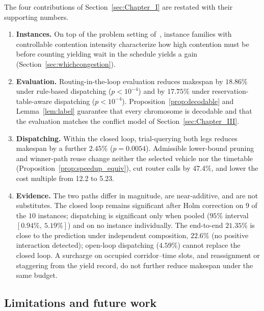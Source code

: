 \documentclass[manuscript,screen,review]{acmart}
\newcommand{\NCases}{10}
\newcommand{\GainLoopRule}{18.86\%}      %
\newcommand{\PLoopRule}{<10^{-4}}
\newcommand{\GainLoopProbe}{17.75\%}     %
\newcommand{\PLoopProbe}{<10^{-4}}
\newcommand{\GainProbeOpen}{4.59\%}      %
\newcommand{\GainProbeLoop}{2.45\%}      %
\newcommand{\PProbeLoop}{=0.0054}
\newcommand{\GainEndToEnd}{21.35\%}      %
\newcommand{\CIProbeLoop}{$[0.94\%,\ 5.19\%]$}
\newcommand{\GainIndepProduct}{22.6\%}
\newcommand{\CellsSigLoopAdj}{9}
\newcommand{\RouteCallCut}{47.4\%}
\newcommand{\CostMultBefore}{12.2}
\newcommand{\CostMultAfter}{5.23}
\begin{document}
The four contributions of Section~\ref{sec:Chapter_I} are restated with their supporting numbers.
\begin{enumerate}[leftmargin=*,topsep=2pt,itemsep=2pt]
\item \textbf{Instances.} On top of the problem setting of~\cite{vanos2026exact}, instance families with controllable contention intensity characterize how high contention must be before counting yielding wait in the schedule yields a gain (Section~\ref{sec:whichcongestion}).
\item \textbf{Evaluation.} Routing-in-the-loop evaluation reduces makespan by $\GainLoopRule$ under rule-based dispatching ($p\PLoopRule$) and by $\GainLoopProbe$ under reservation-table-aware dispatching ($p\PLoopProbe$).
Proposition~\ref{prop:decodable} and Lemma~\ref{lem:label} guarantee that every chromosome is decodable and that the evaluation matches the conflict model of Section~\ref{sec:Chapter_III}.
\item \textbf{Dispatching.} Within the closed loop, trial-querying both legs reduces makespan by a further $\GainProbeLoop$ ($p\PProbeLoop$).
Admissible lower-bound pruning and winner-path reuse change neither the selected vehicle nor the timetable (Proposition~\ref{prop:speedup_equiv}), cut router calls by \RouteCallCut{}, and lower the cost multiple from \CostMultBefore{} to \CostMultAfter{}.
\item \textbf{Evidence.} The two paths differ in magnitude, are near-additive, and are not substitutes.
The closed loop remains significant after Holm correction on \CellsSigLoopAdj{} of the $\NCases$ instances; dispatching is significant only when pooled ($95\%$ interval \CIProbeLoop{}) and on no instance individually.
The end-to-end $\GainEndToEnd$ is close to the prediction under independent composition, $\GainIndepProduct$ (no positive interaction detected); open-loop dispatching ($\GainProbeOpen$) cannot replace the closed loop.
A surcharge on occupied corridor--time slots, and reassignment or staggering from the yield record, do not further reduce makespan under the same budget.
\end{enumerate}

\subsection{Limitations and future work}
\label{sec:limitations}
\label{sec:future_work}
\end{document}
